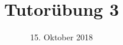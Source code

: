 %
% 
% 
%







\newcommand{\Datum}{\today}

\renewcommand{\PraesentationFusszeileZusatz}{| Tutorium Grundlagen: Datenbanken WS 18/19}

\title{Tutorübung 3}
\author{\PersonVorname{} \PersonNachname}
\institute[]{\UniversitaetName \\ \FakultaetName}
\date[\Datum]{15. Oktober 2018}



\setlength{\baselineskip}{\PraesentationAbstandAbsatz}
\setlength{\parskip}{\baselineskip}

\PraesentationMasterStandard

\PraesentationTitelseite %


